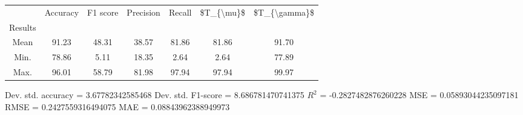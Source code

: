 \begin{tabular}{|c|c|c|c|c|c|c|}
\toprule
{} &  Accuracy &  F1 score &  Precision &  Recall &  \$T\_\{\textbackslash mu\}\$ &  \$T\_\{\textbackslash gamma\}\$ \\
Results &           &           &            &         &            &               \\
\hline
Mean    &     91.23 &     48.31 &      38.57 &   81.86 &      81.86 &         91.70 \\
Min.    &     78.86 &      5.11 &      18.35 &    2.64 &       2.64 &         77.89 \\
Max.    &     96.01 &     58.79 &      81.98 &   97.94 &      97.94 &         99.97 \\
\bottomrule
\end{tabular}

 Dev. std. accuracy = 3.67782342585468
 Dev. std. F1-score = 8.686781470741375
 $R^2$ = -0.2827482876260228
 MSE = 0.05893044235097181
 RMSE = 0.2427559316494075
 MAE = 0.08843962388949973